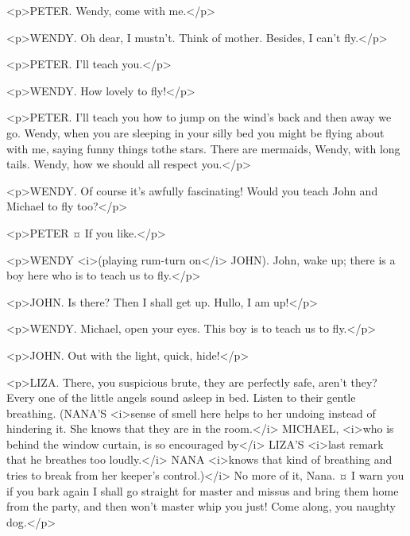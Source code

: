 <p>PETER. Wendy, come with me.</p>

<p>WENDY. Oh dear, I mustn't. Think of mother. Besides, I can't fly.</p>

<p>PETER. I'll teach you.</p>

<p>WENDY. How lovely to fly!</p>

<p>PETER. I'll teach you how to jump on the wind's back and then away we go. Wendy, when you are sleeping in your silly bed you might be flying about with me, saying funny things tothe stars. There are mermaids, Wendy, with long tails.
Wendy, how we should all respect you.</p>


<p>WENDY. Of course it's awfully fascinating! Would you teach John and Michael to fly too?</p>

<p>PETER ¤
If you like.</p>

<p>WENDY <i>(playing rum-turn on</i> JOHN). John, wake up; there is a boy here who is to teach us to fly.</p>

<p>JOHN. Is there? Then I shall get up.
Hullo, I am up!</p>

<p>WENDY. Michael, open your eyes. This boy is to teach us to fly.</p>


<p>JOHN. Out with the light, quick, hide!</p>


<p>LIZA. There, you suspicious brute, they are perfectly safe, aren't they? Every one of the little angels sound asleep in bed. Listen to their gentle breathing. (NANA'S <i>sense of smell here helps to her undoing instead of hindering it. She knows that they are in the room.</i> MICHAEL, <i>who is behind the window curtain, is so encouraged by</i> LIZA'S <i>last remark that he breathes too loudly.</i> NANA <i>knows that kind of breathing and tries to break from her keeper's control.)</i> No more of it, Nana.
¤
I warn you if you bark again I shall go straight for master and missus and bring them home from the party, and then won't master whip you just! Come along, you naughty dog.</p>


